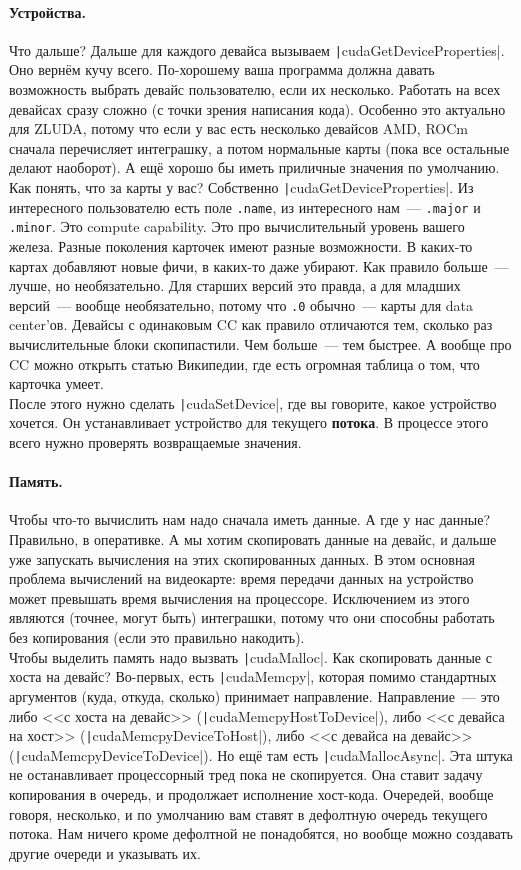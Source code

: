 \documentclass{article}
\begin{document}
    \paragraph{Устройства.}
    Что дальше? Дальше для каждого девайса вызываем \texttt|cudaGetDeviceProperties|. Оно вернём кучу всего. По-хорошему ваша программа должна давать возможность выбрать девайс пользователю, если их несколько. Работать на всех девайсах сразу сложно (с точки зрения написания кода). Особенно это актуально для ZLUDA, потому что если у вас есть несколько девайсов AMD, ROCm сначала перечисляет интеграшку, а потом нормальные карты (пока все остальные делают наоборот). А ещё хорошо бы иметь приличные значения по умолчанию. Как понять, что за карты у вас? Собственно \texttt|cudaGetDeviceProperties|. Из интересного пользователю есть поле \Verb|.name|, из интересного нам~--- \Verb|.major| и \Verb|.minor|. Это compute capability. Это про вычислительный уровень вашего железа. Разные поколения карточек имеют разные возможности. В каких-то картах добавляют новые фичи, в каких-то даже убирают. Как правило больше~--- лучше, но необязательно. Для старших версий это правда, а для младших версий~--- вообще необязательно, потому что \Verb|.0| обычно~--- карты для data center'ов. Девайсы с одинаковым CC как правило отличаются тем, сколько раз вычислительные блоки скопипастили. Чем больше~--- тем быстрее. А вообще про CC можно открыть статью Википедии, где есть огромная таблица о том, что карточка умеет.\\
    После этого нужно сделать \texttt|cudaSetDevice|, где вы говорите, какое устройство хочется. Он устанавливает устройство для текущего \textbf{потока}. В процессе этого всего нужно проверять возвращаемые значения.
    \paragraph{Память.}
    Чтобы что-то вычислить нам надо сначала иметь данные. А где у нас данные? Правильно, в оперативке. А мы хотим скопировать данные на девайс, и дальше уже запускать вычисления на этих скопированных данных. В этом основная проблема вычислений на видеокарте: время передачи данных на устройство может превышать время вычисления на процессоре. Исключением из этого являются (точнее, могут быть) интеграшки, потому что они способны работать без копирования (если это правильно накодить).\\
    Чтобы выделить память надо вызвать \texttt|cudaMalloc|. Как скопировать данные с хоста на девайс? Во-первых, есть \texttt|cudaMemcpy|, которая помимо стандартных аргументов (куда, откуда, сколько) принимает направление. Направление~--- это либо <<с хоста на девайс>> (\texttt|cudaMemcpyHostToDevice|), либо <<с девайса на хост>> (\texttt|cudaMemcpyDeviceToHost|), либо <<с девайса на девайс>> (\texttt|cudaMemcpyDeviceToDevice|). Но ещё там есть \texttt|cudaMallocAsync|. Эта штука не останавливает процессорный тред пока не скопируется. Она ставит задачу копирования в очередь, и продолжает исполнение хост-кода. Очередей, вообще говоря, несколько, и по умолчанию вам ставят в дефолтную очередь текущего потока. Нам ничего кроме дефолтной не понадобятся, но вообще можно создавать другие очереди и указывать их.
\end{document}
